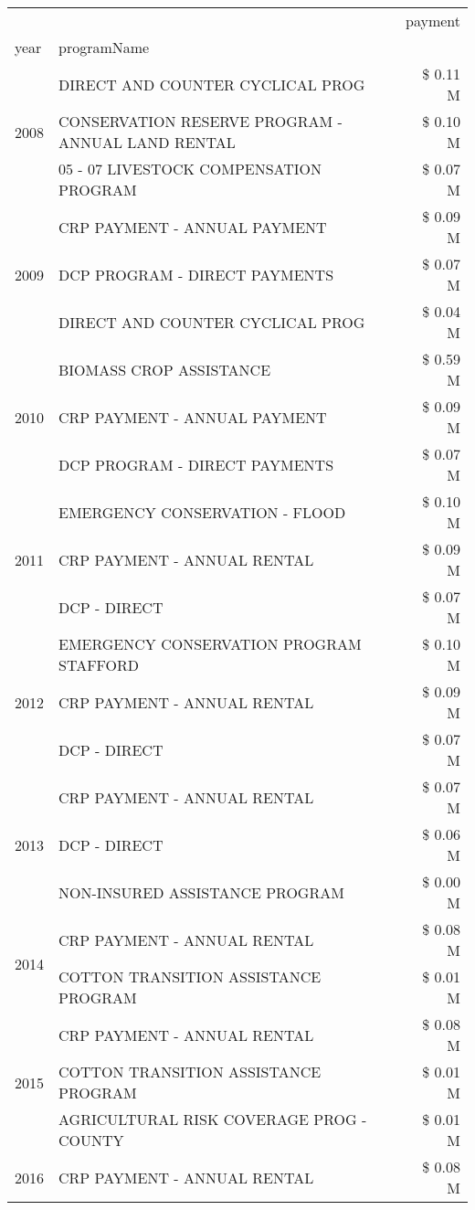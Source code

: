 \begin{tabular}{llr}
\toprule
 &  & payment \\
year & programName &  \\
\midrule
\multirow[t]{3}{*}{2008} & DIRECT AND COUNTER CYCLICAL PROG & \$ 0.11 M \\
 & CONSERVATION RESERVE PROGRAM - ANNUAL LAND RENTAL & \$ 0.10 M \\
 & 05 - 07 LIVESTOCK COMPENSATION PROGRAM & \$ 0.07 M \\
\cline{1-3}
\multirow[t]{3}{*}{2009} & CRP PAYMENT - ANNUAL PAYMENT & \$ 0.09 M \\
 & DCP PROGRAM - DIRECT PAYMENTS & \$ 0.07 M \\
 & DIRECT AND COUNTER CYCLICAL PROG & \$ 0.04 M \\
\cline{1-3}
\multirow[t]{3}{*}{2010} & BIOMASS CROP ASSISTANCE & \$ 0.59 M \\
 & CRP PAYMENT - ANNUAL PAYMENT & \$ 0.09 M \\
 & DCP PROGRAM - DIRECT PAYMENTS & \$ 0.07 M \\
\cline{1-3}
\multirow[t]{3}{*}{2011} & EMERGENCY CONSERVATION - FLOOD & \$ 0.10 M \\
 & CRP PAYMENT - ANNUAL RENTAL & \$ 0.09 M \\
 & DCP - DIRECT & \$ 0.07 M \\
\cline{1-3}
\multirow[t]{3}{*}{2012} & EMERGENCY CONSERVATION PROGRAM STAFFORD & \$ 0.10 M \\
 & CRP PAYMENT - ANNUAL RENTAL & \$ 0.09 M \\
 & DCP - DIRECT & \$ 0.07 M \\
\cline{1-3}
\multirow[t]{3}{*}{2013} & CRP PAYMENT - ANNUAL RENTAL & \$ 0.07 M \\
 & DCP - DIRECT & \$ 0.06 M \\
 & NON-INSURED ASSISTANCE PROGRAM & \$ 0.00 M \\
\cline{1-3}
\multirow[t]{2}{*}{2014} & CRP PAYMENT - ANNUAL RENTAL & \$ 0.08 M \\
 & COTTON TRANSITION ASSISTANCE PROGRAM & \$ 0.01 M \\
\cline{1-3}
\multirow[t]{3}{*}{2015} & CRP PAYMENT - ANNUAL RENTAL & \$ 0.08 M \\
 & COTTON TRANSITION ASSISTANCE PROGRAM & \$ 0.01 M \\
 & AGRICULTURAL RISK COVERAGE PROG - COUNTY & \$ 0.01 M \\
\cline{1-3}
\multirow[t]{3}{*}{2016} & CRP PAYMENT - ANNUAL RENTAL & \$ 0.08 M \\

\end{tabular}
